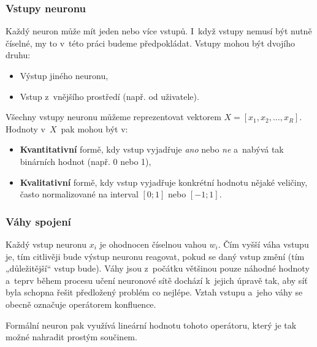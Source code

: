 \documentclass[a4paper,12pt]{article}
\begin{document}
{{{{

\subsubsection{Vstupy neuronu}

Každý neuron může mít jeden nebo více vstupů. I~když vstupy nemusí být nutně číselné, my to v~této práci budeme předpokládat. Vstupy mohou být dvojího druhu:

\begin{itemize}
\item Výstup jiného neuronu,
\item Vstup z~vnějšího prostředí (např. od uživatele).
\end{itemize}

Všechny vstupy neuronu můžeme reprezentovat vektorem $X = [{x_1, x_2, ..., x_R}]$. Hodnoty v~$X$~pak mohou být v:

\begin{itemize}
\item \textbf{Kvantitativní} formě, kdy vstup vyjadřuje \textit{ano} nebo \textit{ne} a~nabývá tak binárních hodnot (např. 0 nebo 1),
\item \textbf{Kvalitativní} formě, kdy vstup vyjadřuje konkrétní hodnotu nějaké veličiny, často normalizované na interval $[0; 1]$ nebo $[-1; 1]$.
\end{itemize}

\subsubsection{Váhy spojení}

Každý vstup neuronu $x_i$ je ohodnocen číselnou vahou $w_i$. Čím vyšší váha vstupu je, tím citlivěji bude výstup neuronu reagovat, pokud se daný vstup změní (tím „důležitější“ vstup bude). Váhy jsou z~počátku většinou pouze náhodné hodnoty a~teprv během procesu učení neuronové sítě dochází k~jejich úpravě tak, aby síť byla schopna řešit předložený problém co nejlépe. Vztah vstupu a~jeho váhy se obecně označuje operátorem konfluence.~\cite{nn}


Formální neuron pak využívá lineární hodnotu tohoto operátoru, který je tak možné nahradit prostým součinem.~\cite{nn}


}}}}
\end{document}
